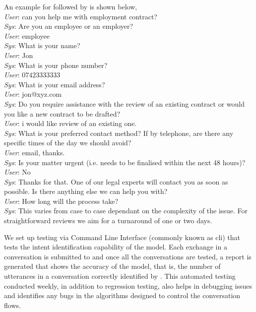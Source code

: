\documentclass[runningheads]{llncs}
\begin{document}
An example for \ff followed by \faq is shown below,\\
\textit{User}: can you help me with employment contract?\\
\textit{Sys}: Are you an employee or an employer?\\
\textit{User}: employee	\\
\textit{Sys}: What is your name?\\
\textit{User}: Jon	\\
\textit{Sys}: What is your phone number?\\
\textit{User}: $07423333333$\\
\textit{Sys}: What is your email address?\\
\textit{User}: jon@xyz.com\\
\textit{Sys}: Do you require assistance with the review of an existing contract or would you like a new contract to be drafted?\\
\textit{User}: i would like review of an existing one.\\
\textit{Sys}: What is your preferred contact method? If by telephone, are there any specific times of the day we should avoid?\\
\textit{User}: email, thanks.\\
\textit{Sys}: Is your matter urgent (i.e. needs to be finalised within the next 48 hours)?
\textit{User}: No\\
\textit{Sys}: Thanks for that. One of our legal experts will contact you as soon as possible. Is there anything else we can help you with?\\
\textit{User}: How long will the process take?\\
\textit{Sys}: This varies from case to case dependant on the complexity of the issue. For straightforward reviews we aim for a turnaround of one or two days.

We set up testing via \aws Command Line Interface (commonly known as \aws cli) that tests the intent identification capability of the model. Each exchange in a conversation is submitted to \lex and once all the conversations are tested, a report is generated that shows the accuracy of the model, that is, the number of utterances in a conversation correctly identified by \lex. This automated testing conducted weekly, in addition to regression testing, also helps in debugging issues and identifies any bugs in the algorithms designed to control the conversation flows.
\end{document}
